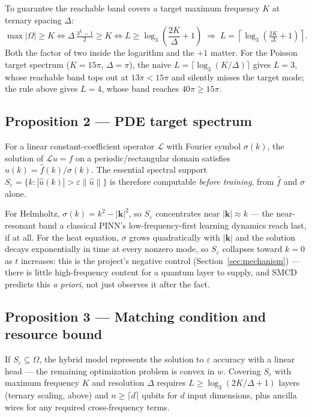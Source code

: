 To guarantee the reachable band covers a target maximum frequency $K$ at ternary spacing
$\Delta$:
\[
  \max|\Omega| \ge K
  \iff \Delta\,\tfrac{3^L-1}{2}\ge K
  \iff L \ge \log_3\!\left(\frac{2K}{\Delta}+1\right)
  \;\Longrightarrow\;
  \boxed{L = \left\lceil \log_3\!\left(\tfrac{2K}{\Delta}+1\right)\right\rceil.}
\]
Both the factor of two inside the logarithm and the $+1$ matter. For the Poisson target
spectrum ($K=15\pi$, $\Delta=\pi$), the naive $L=\lceil\log_3(K/\Delta)\rceil$ gives
$L=3$, whose reachable band tops out at $13\pi < 15\pi$ and silently misses the target
mode; the rule above gives $L=4$, whose band reaches $40\pi \ge 15\pi$.

\subsection{Proposition 2 --- PDE target spectrum}

\begin{proposition}
For a linear constant-coefficient operator $\mathcal{L}$ with Fourier symbol $\sigma(k)$,
the solution of $\mathcal{L}u=f$ on a periodic/rectangular domain satisfies
$\hat u(k) = \hat f(k)/\sigma(k)$. The essential spectral support
$S_\varepsilon = \{k : |\hat u(k)| > \varepsilon\|\hat u\|\}$ is therefore computable
\emph{before training}, from $\hat f$ and $\sigma$ alone.
\end{proposition}

For Helmholtz, $\sigma(k) = k^2 - |\mathbf{k}|^2$, so $S_\varepsilon$ concentrates near
$|\mathbf{k}|\approx k$ --- the near-resonant band a classical PINN's low-frequency-first
learning dynamics reach last, if at all. For the heat equation, $\sigma$ grows
quadratically with $|\mathbf{k}|$ and the solution decays exponentially in time at every
nonzero mode, so $S_\varepsilon$ collapses toward $k=0$ as $t$ increases: this is the
project's negative control (Section~\ref{sec:mechanism}) --- there is little high-frequency
content for a quantum layer to supply, and SMCD predicts this \emph{a priori}, not just
observes it after the fact.

\subsection{Proposition 3 --- Matching condition and resource bound}

\begin{proposition}
If $S_\varepsilon \subseteq \Omega$, the hybrid model represents the solution to
$\varepsilon$ accuracy with a linear head --- the remaining optimization problem is convex
in $w$. Covering $S_\varepsilon$ with maximum frequency $K$ and resolution $\Delta$
requires $L \ge \log_3(2K/\Delta+1)$ layers (ternary scaling, above) and
$n \ge \lceil d\rceil$ qubits for $d$ input dimensions, plus ancilla wires for any required
cross-frequency terms.
\end{proposition}

